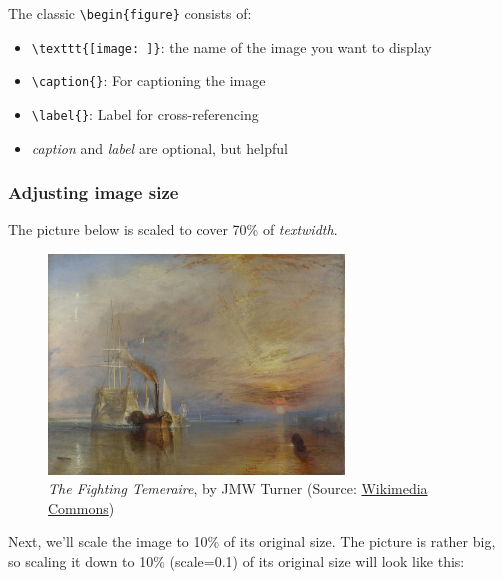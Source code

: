 \documentclass{article}
\begin{document}
The classic \verb|\begin{figure}| consists of:\\
\vspace{1.5mm}
\begin{itemize}
    \item \verb|\texttt{[image: ]}|: the name of the image you want to display
    \item \verb|\caption{}|: For captioning the image
    \item \verb|\label{}|: Label for cross-referencing
    \item \textit{caption} and \textit{label} are optional, but helpful
\end{itemize}

\subsubsection{Adjusting image size}

The picture below is scaled to cover 70\% of \textit{textwidth}.

\begin{figure}[H]
    \centering
    \includegraphics[width=0.7\textwidth]{temeraire.jpg}
    \caption{\textit{The Fighting Temeraire}, by JMW Turner (Source: \href{https://commons.wikimedia.org/wiki/File:The_Fighting_Temeraire,_JMW_Turner,_National_Gallery.jpg}{Wikimedia Commons})}
    \label{fig:temeraire_normal}
\end{figure} 

\newpage

Next, we'll scale the image to 10\% of its original size. The picture is rather big, so scaling it down to 10\% (scale=0.1) of its original size will look like this:
\end{document}
